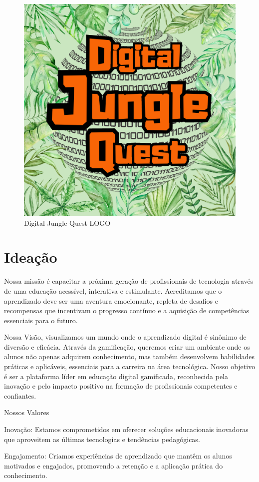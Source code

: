 \begin{figure}
    \centering
    \includegraphics[width=0.75\linewidth]{figuras/DigitalJungleQuestLOGO.png}
    \caption{Digital Jungle Quest LOGO}
    \label{fig:enter-label}
\end{figure}

\chapter{Ideação}
\label{ch:Ideação}
Nossa missão é capacitar a próxima geração de profissionais de tecnologia através de uma educação acessível, interativa e estimulante. Acreditamos que o aprendizado deve ser uma aventura emocionante, repleta de desafios e recompensas que incentivam o progresso contínuo e a aquisição de competências essenciais para o futuro.

Nossa Visão, visualizamos um mundo onde o aprendizado digital é sinônimo de diversão e eficácia. Através da gamificação, queremos criar um ambiente onde os alunos não apenas adquirem conhecimento, mas também desenvolvem habilidades práticas e aplicáveis, essenciais para a carreira na área tecnológica. Nosso objetivo é ser a plataforma líder em educação digital gamificada, reconhecida pela inovação e pelo impacto positivo na formação de profissionais competentes e confiantes.

Nossos Valores

Inovação:
Estamos comprometidos em oferecer soluções educacionais inovadoras que aproveitem as últimas tecnologias e tendências pedagógicas.

Engajamento:
Criamos experiências de aprendizado que mantêm os alunos motivados e engajados, promovendo a retenção e a aplicação prática do conhecimento.

